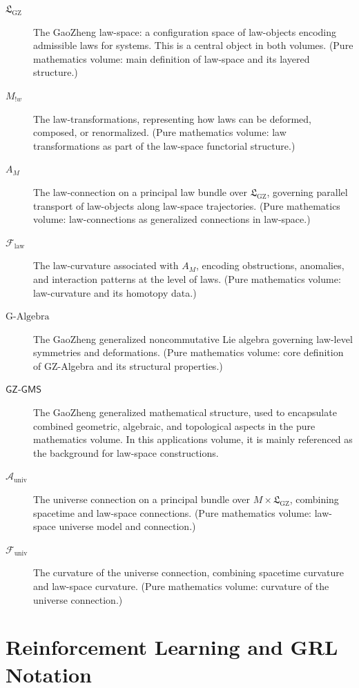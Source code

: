 \documentclass[11pt]{book}
\newcommand{\GAlgebra}{\text{G-Algebra}}
\newcommand{\GZLS}{\ensuremath{\mathfrak{L}_{\mathrm{GZ}}}}
\newcommand{\GZLT}{\ensuremath{M_{!w}}}
\newcommand{\GZLOC}{\ensuremath{A_M}}
\newcommand{\GZLCurv}{\ensuremath{\mathcal{F}_{\mathrm{law}}}}
\newcommand{\GZGMS}{\textsf{GZ-GMS}}
\newcommand{\Base}{\ensuremath{M}}
\theoremstyle{plain}
\theoremstyle{definition}
\theoremstyle{remark}
\begin{document}
\begin{description}
  \item[$\GZLS$]
    The GaoZheng law-space: a configuration space of law-objects
    encoding admissible laws for systems. This is a central object
    in both volumes. (Pure mathematics volume: main definition of
    law-space and its layered structure.)
  \item[$\GZLT$]
    The law-transformations, representing how laws can be deformed,
    composed, or renormalized. (Pure mathematics volume: law
    transformations as part of the law-space functorial structure.)
  \item[$\GZLOC$]
    The law-connection on a principal law bundle over $\GZLS$,
    governing parallel transport of law-objects along law-space
    trajectories. (Pure mathematics volume: law-connections as
    generalized connections in law-space.)
  \item[$\GZLCurv$]
    The law-curvature associated with $\GZLOC$, encoding obstructions,
    anomalies, and interaction patterns at the level of laws.
    (Pure mathematics volume: law-curvature and its homotopy data.)
  \item[$\GAlgebra$]
    The GaoZheng generalized noncommutative Lie algebra governing
    law-level symmetries and deformations. (Pure mathematics volume:
    core definition of GZ-Algebra and its structural properties.)
  \item[$\GZGMS$]
    The GaoZheng generalized mathematical structure, used to
    encapsulate combined geometric, algebraic, and topological
    aspects in the pure mathematics volume. In this applications
    volume, it is mainly referenced as the background for law-space
    constructions.
  \item[$\mathcal{A}_{\mathrm{univ}}$]
    The universe connection on a principal bundle over
    $\Base \times \GZLS$, combining spacetime and law-space
    connections. (Pure mathematics volume: law-space universe model
    and connection.)
  \item[$\mathcal{F}_{\mathrm{univ}}$]
    The curvature of the universe connection, combining spacetime
    curvature and law-space curvature. (Pure mathematics volume:
    curvature of the universe connection.)
\end{description}

\section*{Reinforcement Learning and GRL Notation}
\end{document}
